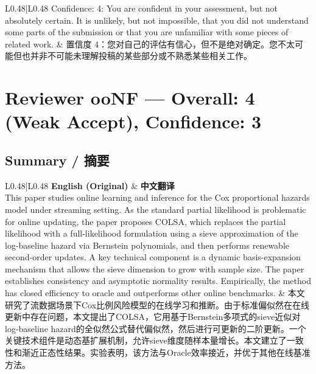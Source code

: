 \documentclass[10pt,a4paper]{article}
\begin{document}
\begin{longtable}{L{0.48\textwidth}|L{0.48\textwidth}}
\hline
Confidence: 4: You are confident in your assessment, but not absolutely certain. It is unlikely, but not impossible, that you did not understand some parts of the submission or that you are unfamiliar with some pieces of related work.
&
置信度 4：您对自己的评估有信心，但不是绝对确定。您不太可能但也并非不可能未理解投稿的某些部分或不熟悉某些相关工作。 \\
\hline
\end{longtable}


\newpage
\section{Reviewer ooNF --- Overall: 4 (Weak Accept), Confidence: 3}

\subsection{Summary / 摘要}

\begin{longtable}{L{0.48\textwidth}|L{0.48\textwidth}}
\hline
\textbf{English (Original)} & \textbf{中文翻译} \\
\hline
This paper studies online learning and inference for the Cox proportional hazards model under streaming setting. As the standard partial likelihood is problematic for online updating, the paper proposes COLSA, which replaces the partial likelihood with a full-likelihood formulation using a sieve approximation of the log-baseline hazard via Bernstein polynomials, and then performs renewable second-order updates. A key technical component is a dynamic basis-expansion mechanism that allows the sieve dimension to grow with sample size. The paper establishes consistency and asymptotic normality results. Empirically, the method has closed efficiency to oracle and outperforms other online benchmarks.
&
本文研究了流数据场景下Cox比例风险模型的在线学习和推断。由于标准偏似然在在线更新中存在问题，本文提出了COLSA，它用基于Bernstein多项式的sieve近似对log-baseline hazard的全似然公式替代偏似然，然后进行可更新的二阶更新。一个关键技术组件是动态基扩展机制，允许sieve维度随样本量增长。本文建立了一致性和渐近正态性结果。实验表明，该方法与Oracle效率接近，并优于其他在线基准方法。 \\
\hline
\end{longtable}
\end{document}
